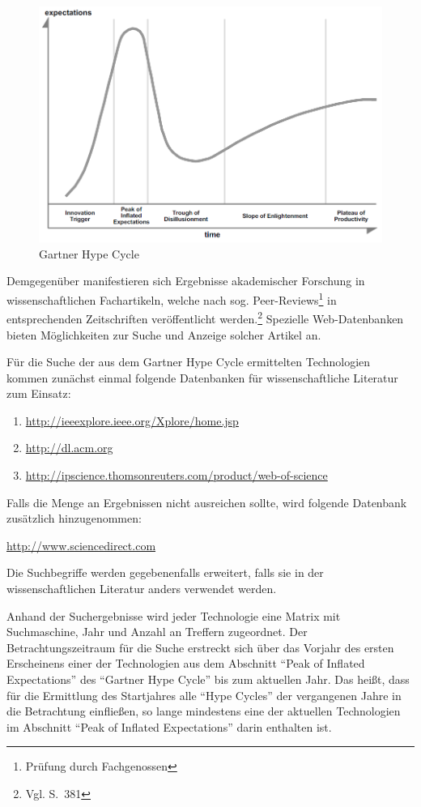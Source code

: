 \begin{figure}
	\centering
	\includegraphics[width=0.9\linewidth]{img/ghc_raw}
	\caption{Gartner Hype Cycle}%
	\label{fig:ghc_raw}
\end{figure}


Demgegenüber manifestieren sich Ergebnisse akademischer Forschung in wissenschaftlichen Fachartikeln, welche nach sog. \glqq Peer-Reviews\grqq \footnote{Prüfung durch Fachgenossen} in entsprechenden Zeitschriften veröffentlicht werden.\footnote{Vgl.  S.~381} Spezielle Web-Datenbanken bieten Möglichkeiten zur Suche und Anzeige solcher Artikel an.

Für die Suche der aus dem \glqq Gartner Hype Cycle \grqq ermittelten Technologien kommen zunächst einmal folgende Datenbanken für wissenschaftliche Literatur zum Einsatz:
\begin{enumerate}
	\item \url{http://ieeexplore.ieee.org/Xplore/home.jsp}
	\item \url{http://dl.acm.org}
	\item \url{http://ipscience.thomsonreuters.com/product/web-of-science}
\end{enumerate}

Falls die Menge an Ergebnissen nicht ausreichen sollte, wird folgende Datenbank zusätzlich hinzugenommen:

\url{http://www.sciencedirect.com}

Die Suchbegriffe werden gegebenenfalls erweitert, falls sie in der wissenschaftlichen Literatur anders verwendet werden.

Anhand der Suchergebnisse wird jeder Technologie eine Matrix mit Suchmaschine, Jahr und Anzahl an Treffern zugeordnet.
Der Betrachtungszeitraum für die Suche erstreckt sich über das Vorjahr des ersten Erscheinens einer der Technologien aus dem Abschnitt "`Peak of Inflated Expectations"' des "`Gartner Hype Cycle"' bis zum aktuellen Jahr. Das heißt, dass für die Ermittlung des Startjahres alle "`Hype Cycles"' der vergangenen Jahre in die Betrachtung einfließen, so lange mindestens eine der aktuellen Technologien im Abschnitt "`Peak of Inflated Expectations"' darin enthalten ist.

